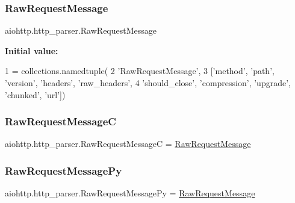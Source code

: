 \subsubsection{\texorpdfstring{Raw\+Request\+Message}{RawRequestMessage}}
{\footnotesize\ttfamily aiohttp.\+http\+\_\+parser.\+Raw\+Request\+Message}

{\bfseries Initial value\+:}
\begin{DoxyCode}
1 =  collections.namedtuple(
2     \textcolor{stringliteral}{'RawRequestMessage'},
3     [\textcolor{stringliteral}{'method'}, \textcolor{stringliteral}{'path'}, \textcolor{stringliteral}{'version'}, \textcolor{stringliteral}{'headers'}, \textcolor{stringliteral}{'raw\_headers'},
4      \textcolor{stringliteral}{'should\_close'}, \textcolor{stringliteral}{'compression'}, \textcolor{stringliteral}{'upgrade'}, \textcolor{stringliteral}{'chunked'}, \textcolor{stringliteral}{'url'}])
\end{DoxyCode}
\mbox{\label{namespaceaiohttp_1_1http__parser_a7f562f3a7257700351e9b4ff57753a0e}} 
\subsubsection{\texorpdfstring{Raw\+Request\+MessageC}{RawRequestMessageC}}
{\footnotesize\ttfamily aiohttp.\+http\+\_\+parser.\+Raw\+Request\+MessageC = \hyperlink{namespaceaiohttp_1_1http__parser_a4145f5fa947ac335040e980b0dca95b4}{Raw\+Request\+Message}}

\mbox{\label{namespaceaiohttp_1_1http__parser_aceeb7becd192bc314ffb5275726a611d}} 
\subsubsection{\texorpdfstring{Raw\+Request\+Message\+Py}{RawRequestMessagePy}}
{\footnotesize\ttfamily aiohttp.\+http\+\_\+parser.\+Raw\+Request\+Message\+Py = \hyperlink{namespaceaiohttp_1_1http__parser_a4145f5fa947ac335040e980b0dca95b4}{Raw\+Request\+Message}}

